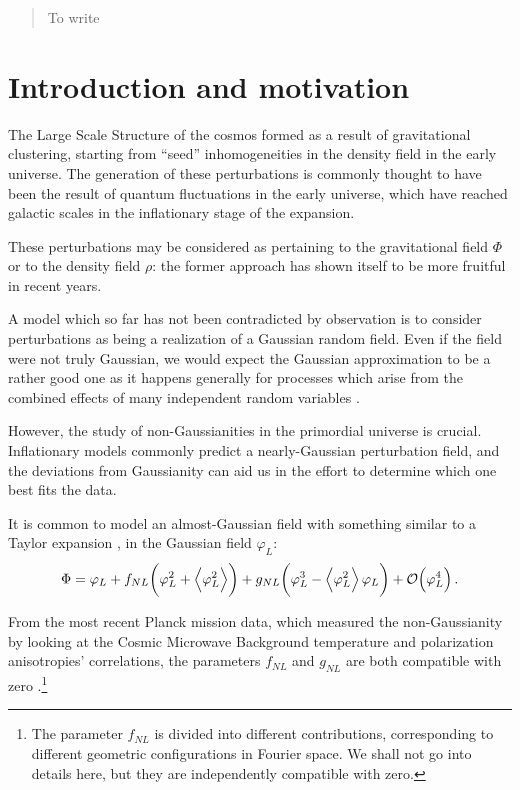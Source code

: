 \documentclass[main.tex]{subfiles}
\begin{document}
\begin{abstract}
    To write
\end{abstract}

\section{Introduction and motivation}

The Large Scale Structure of the cosmos formed as a result of gravitational clustering, starting from ``seed'' inhomogeneities in the density field in the early universe. 
The generation of these perturbations is commonly thought to have been the result of quantum fluctuations in the early universe, which have reached galactic scales in the inflationary stage of the expansion. 

These perturbations may be considered as pertaining to the gravitational field \(\Phi \) or to the density field \(\rho \): the former approach has shown itself to be more fruitful in recent years.

A model which so far has not been contradicted by observation is to consider perturbations as being a realization of a Gaussian random field. 
Even if the field were not truly Gaussian, we would expect the Gaussian approximation to be a rather good one as it happens generally for processes which arise from the combined effects of many independent random variables \cite[pag.\ 2]{celoriaPrimordialNonGaussianity2018}. 

However, the study of non-Gaussianities in the primordial universe is crucial. Inflationary models commonly predict a nearly-Gaussian perturbation field, and the deviations from Gaussianity can aid us in the effort to determine which one best fits the data. 

It is common to model an almost-Gaussian field with something similar to a Taylor expansion \cite[eq.\ 1]{matarreseAbundanceHighRedshift2000}, \cite[eq.\ 1]{celoriaPrimordialNonGaussianity2018} in the Gaussian field \(\varphi _L\): 
%
\begin{align}
\Phi = \varphi _L + f_{NL} \qty(\varphi _L^2 + \expval{\varphi _L^2}) + g_{NL} \qty(\varphi _L^3 - \expval{\varphi _L^2} \varphi _L) + \order{\varphi _L^{4}} 
\,.
\end{align}

From the most recent Planck mission data, which measured the non-Gaussianity by looking at the Cosmic Microwave Background temperature and polarization anisotropies' correlations, the parameters \(f_{NL}\) and \(g_{NL}\) are both compatible with zero \cite[]{planckcollaborationPlanck2018Results2019}.\footnote{The parameter \(f_{{NL}}\) is divided into different contributions, corresponding to different geometric configurations in Fourier space. We shall not go into details here, but they are independently compatible with zero.}
\end{document}

